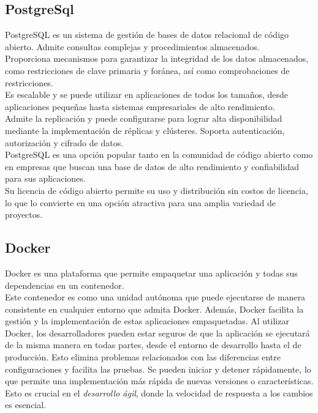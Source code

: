 \subsection{PostgreSql~\cite{juba2015learning}}
PostgreSQL es un sistema de gestión de bases de datos relacional de código abierto. 
Admite consultas complejas y procedimientos almacenados.\\
Proporciona mecanismos para garantizar la integridad de los datos almacenados, 
como restricciones de clave primaria y foránea, así como comprobaciones de restricciones.\\
Es escalable y se puede utilizar en aplicaciones de todos los tamaños, 
desde aplicaciones pequeñas hasta sistemas empresariales de alto rendimiento.\\
Admite la replicación y puede configurarse para lograr alta disponibilidad mediante 
la implementación de réplicas y clústeres.
Soporta autenticación, autorización y cifrado de datos.\\
PostgreSQL es una opción popular tanto en la comunidad de código abierto como 
en empresas que buscan una base de datos de alto rendimiento y confiabilidad para sus aplicaciones.\\
Su licencia de código abierto permite su uso y distribución sin costos de licencia, 
lo que lo convierte en una opción atractiva para una amplia variedad de proyectos.

\subsection{Docker~\cite{garzas2105docker}}
Docker es una plataforma que permite empaquetar una aplicación y 
todas sus dependencias en un contenedor.\\
Este contenedor es como una unidad autónoma que puede ejecutarse de manera 
consistente en cualquier entorno que admita Docker. 
Además, Docker facilita la gestión y la implementación de estas aplicaciones empaquetadas.
Al utilizar Docker, los desarrolladores pueden estar seguros de que la aplicación 
se ejecutará de la misma manera en todas partes, desde el entorno de desarrollo hasta el de producción. 
Esto elimina problemas relacionados con las diferencias entre configuraciones y facilita las pruebas.
Se pueden iniciar y detener rápidamente, lo que permite una implementación más rápida de 
nuevas versiones o características. \\
Esto es crucial en el \emph{desarrollo ágil}, donde la velocidad de respuesta a los cambios es esencial.

